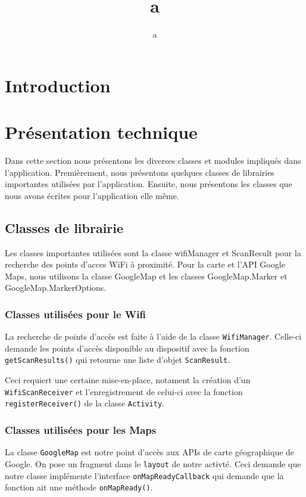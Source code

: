 \documentclass[12pt]{article}
\author{a}
\title{a}
\newcommand\code[1]{\texttt{#1}}
\begin{document}

\setcounter{page}{1}

\tableofcontents

\section{Introduction}

\section{Présentation technique}

	Dans cette section nous présentons les diverses classes et modules impliqués
	dans l'application.  Premièrement, nous présentons quelques classes de
	librairies importantes utilisées par l'application.  Ensuite, nous
	présentons les classes que nous avons écrites pour l'application elle même.

	\subsection{Classes de librairie}

	Les classes importantes utilisées sont la classe wifiManager et ScanResult
	pour la recherche des points d'acces WiFi à proximité.  Pour la carte et
	l'API Google Maps, nous utilisons la classe GoogleMap et les classes
	GoogleMap.Marker et GoogleMap.MarkerOptions.

	\subsubsection{Classes utilisées pour le Wifi}

	La recherche de points d'accès est faite à l'aide de la classe
	\code{WifiManager}.  Celle-ci demande les points d'accès disponible au
	dispositif avec la fonction \code{getScanResults()} qui retourne une liste
	d'objet \code{ScanResult}.

	Ceci requiert une certaine mise-en-place, notament la création d'un
	\code{WifiScanReceiver} et l'enregistrement de celui-ci avec la fonction
	\code{registerReceiver()} de la classe \code{Activity}.

	\subsubsection{Classes utilisées pour les Maps}

	La classe \code{GoogleMap} est notre point d'accès aux APIs de carte
	géographique de Google.  On pose un fragment dans le \code{layout} de notre
	activté.  Ceci demande que notre classe implémente l'interface
	\code{onMapReadyCallback} qui demande que la fonction ait une méthode
	\code{onMapReady()}.
\end{document}
